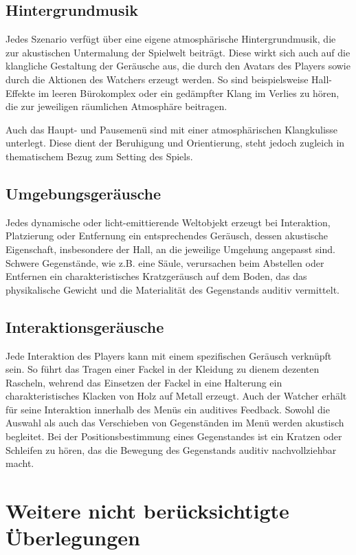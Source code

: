 \subsection{Hintergrundmusik}

Jedes Szenario verfügt über eine eigene atmosphärische Hintergrundmusik, die zur akustischen Untermalung der Spielwelt beiträgt. Diese wirkt sich auch auf die klangliche Gestaltung der Geräusche aus, die durch den Avatars des Players sowie durch die Aktionen des Watchers erzeugt werden. So sind beispielsweise Hall-Effekte im leeren Bürokomplex oder ein gedämpfter Klang im Verlies zu hören, die zur jeweiligen räumlichen Atmosphäre beitragen.

Auch das Haupt- und Pausemenü sind mit einer atmosphärischen Klangkulisse unterlegt. Diese dient der Beruhigung und Orientierung, steht jedoch zugleich in thematischem Bezug zum Setting des Spiels.

\subsection{Umgebungsgeräusche}

Jedes dynamische oder licht-emittierende Weltobjekt erzeugt bei Interaktion, Platzierung oder Entfernung ein entsprechendes Geräusch, dessen akustische Eigenschaft, insbesondere der Hall, an die jeweilige Umgehung angepasst sind. Schwere Gegenstände, wie z.B. eine Säule, verursachen beim Abstellen oder Entfernen ein charakteristisches Kratzgeräusch auf dem Boden, das das physikalische Gewicht und die Materialität des Gegenstands auditiv vermittelt.


\subsection{Interaktionsgeräusche}

Jede Interaktion des Players kann mit einem spezifischen Geräusch verknüpft sein. So führt das Tragen einer Fackel in der Kleidung zu dienem dezenten Rascheln, wehrend das Einsetzen der Fackel in eine Halterung ein charakteristisches Klacken von Holz auf Metall erzeugt. Auch der Watcher erhält für seine Interaktion innerhalb des Menüs ein auditives Feedback. Sowohl die Auswahl als auch das Verschieben von Gegenständen im Menü werden akustisch begleitet. Bei der Positionsbestimmung eines Gegenstandes ist ein Kratzen oder Schleifen zu hören, das die Bewegung des Gegenstands auditiv nachvollziehbar macht.


\section{Weitere nicht berücksichtigte Überlegungen}

